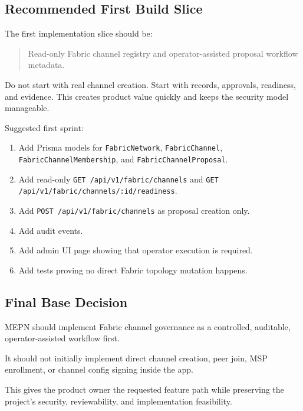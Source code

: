 \subsection{Recommended First Build Slice}

The first implementation slice should be:

\begin{quote}
Read-only Fabric channel registry and operator-assisted proposal workflow metadata.
\end{quote}

Do not start with real channel creation. Start with records, approvals, readiness, and evidence. This creates product value quickly and keeps the security model manageable.

Suggested first sprint:

\begin{enumerate}
  \item Add Prisma models for \texttt{FabricNetwork}, \texttt{FabricChannel}, \texttt{FabricChannelMembership}, and \texttt{FabricChannelProposal}.
  \item Add read-only \texttt{GET /api/v1/fabric/channels} and \texttt{GET /api/v1/fabric/channels/:id/readiness}.
  \item Add \texttt{POST /api/v1/fabric/channels} as proposal creation only.
  \item Add audit events.
  \item Add admin UI page showing that operator execution is required.
  \item Add tests proving no direct Fabric topology mutation happens.
\end{enumerate}

\subsection{Final Base Decision}

MEPN should implement Fabric channel governance as a controlled, auditable, operator-assisted workflow first.

It should not initially implement direct channel creation, peer join, MSP enrollment, or channel config signing inside the app.

This gives the product owner the requested feature path while preserving the project's security, reviewability, and implementation feasibility.
